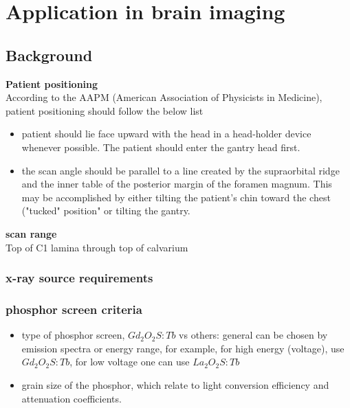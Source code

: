 \chapter{Application in brain imaging}
\section{Background}

\noindent \textbf{Patient positioning} \\
\noindent According to the AAPM (American Association of Physicists in Medicine), patient positioning should follow the below list\citep{aapm_headCT2012}
\begin{itemize}
\item patient should lie face upward with the head in a head-holder device whenever possible.  The patient should enter the gantry head first.
\item the scan angle should be parallel to a line created by the supraorbital ridge and the inner table of the posterior margin of the foramen magnum.  This may be accomplished by either tilting the patient's chin toward the chest ("tucked" position" or tilting the gantry.
\end{itemize}

\noindent \textbf{scan range} \\
\noindent Top of C1 lamina through top of calvarium \\

\subsection{x-ray source requirements}
\subsection{phosphor screen criteria}

\begin{itemize}
\item type of phosphor screen, $Gd_2O_2S:Tb$ vs others: general can be chosen by emission spectra or energy range, for example, for high energy (voltage), use $Gd_2O_2S:Tb$, for low voltage one can use $La_2O_2S:Tb$ \cite{Kandarakis2001}

\item grain size of the phosphor, which relate to light conversion efficiency and attenuation coefficients.

\end{itemize}

